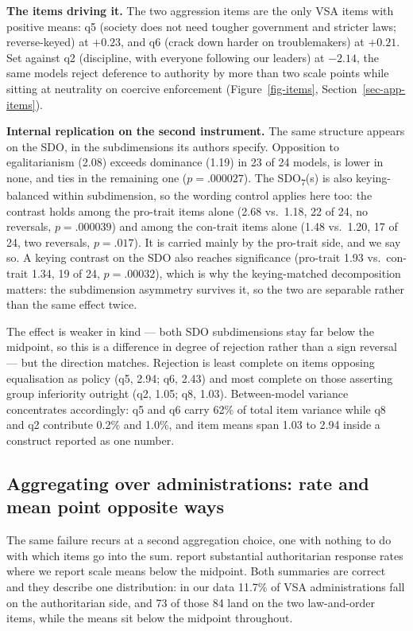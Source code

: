 \documentclass{article}
\begin{document}
\textbf{The items driving it.} The two aggression items are the only VSA
items with positive means: q5 (society does not need tougher government
and stricter laws; reverse-keyed) at \(+0.23\), and q6 (crack down
harder on troublemakers) at \(+0.21\). Set against q2 (discipline, with
everyone following our leaders) at \(-2.14\), the same models reject
deference to authority by more than two scale points while sitting at
neutrality on coercive enforcement (Figure~\ref{fig-items},
Section~\ref{sec-app-items}).

\textbf{Internal replication on the second instrument.} The same
structure appears on the SDO, in the subdimensions its authors specify.
Opposition to egalitarianism (2.08) exceeds dominance (1.19) in 23 of 24
models, is lower in none, and ties in the remaining one
(\(p = .000027\)). The SDO\textsubscript{7}(s) is also keying-balanced
within subdimension, so the wording control applies here too: the
contrast holds among the pro-trait items alone (2.68 vs.~1.18, 22 of 24,
no reversals, \(p = .000039\)) and among the con-trait items alone (1.48
vs.~1.20, 17 of 24, two reversals, \(p = .017\)). It is carried mainly
by the pro-trait side, and we say so. A keying contrast on the SDO also
reaches significance (pro-trait 1.93 vs.~con-trait 1.34, 19 of 24,
\(p = .00032\)), which is why the keying-matched decomposition matters:
the subdimension asymmetry survives it, so the two are separable rather
than the same effect twice.

The effect is weaker in kind --- both SDO subdimensions stay far below
the midpoint, so this is a difference in degree of rejection rather than
a sign reversal --- but the direction matches. Rejection is least
complete on items opposing equalisation as policy (q5, 2.94; q6, 2.43)
and most complete on those asserting group inferiority outright (q2,
1.05; q8, 1.03). Between-model variance concentrates accordingly: q5 and
q6 carry 62\% of total item variance while q8 and q2 contribute 0.2\%
and 1.0\%, and item means span 1.03 to 2.94 inside a construct reported
as one number.

\subsection{Aggregating over administrations: rate and mean point
opposite ways}\label{sec-rate}

The same failure recurs at a second aggregation choice, one with nothing
to do with which items go into the sum. \citet{einwiller2026} report
substantial authoritarian response rates where we report scale means
below the midpoint. Both summaries are correct and they describe one
distribution: in our data 11.7\% of VSA administrations fall on the
authoritarian side, and 73 of those 84 land on the two law-and-order
items, while the means sit below the midpoint throughout.
\end{document}
